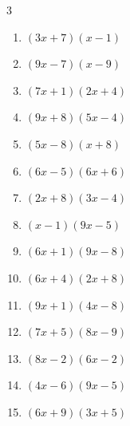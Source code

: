 \begin{multicols}{3}
\begin{enumerate}
  \item $(3x+7)(x-1)$


  \item $(9x-7)(x-9)$


  \item $(7x+1)(2x+4)$


  \item $(9x+8)(5x-4)$


  \item $(5x-8)(x+8)$


\columnbreak %

  \item $(6x-5)(6x+6)$


  \item $(2x+8)(3x-4)$


  \item $(x-1)(9x-5)$


  \item $(6x+1)(9x-8)$


  \item $(6x+4)(2x+8)$


  \item $(9x+1)(4x-8)$


  \item $(7x+5)(8x-9)$


  \item $(8x-2)(6x-2)$


  \item $(4x-6)(9x-5)$


  \item $(6x+9)(3x+5)$


\end{enumerate}
\end{multicols}
